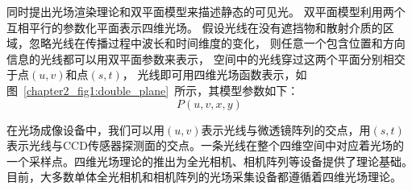 同时提出光场渲染理论和双平面模型来描述静态的可见光。
双平面模型利用两个互相平行的参数化平面表示四维光场。
假设光线在没有遮挡物和散射介质的区域，忽略光线在传播过程中波长和时间维度的变化，
则任意一个包含位置和方向信息的光线都可以用双平面参数来表示，
空间中的光线穿过这两个平面分别相交于点$(u, v)$和点$(s, t)$，
光线即可用四维光场函数表示，如图~\ref{chapter2_fig1:double_plane}~所示，其模型参数如下：
\begin{equation}
	P(u, v, x, y)
\end{equation}\par
在光场成像设备中，我们可以用$(u, v)$表示光线与微透镜阵列的交点，用$(s, t)$表示光线与CCD传感器探测面的交点。一条光线在整个四维空间中对应着光场的一个采样点。四维光场理论的推出为全光相机、相机阵列等设备提供了理论基础。目前，大多数单体全光相机和相机阵列的光场采集设备都遵循着四维光场理论。
%
%


